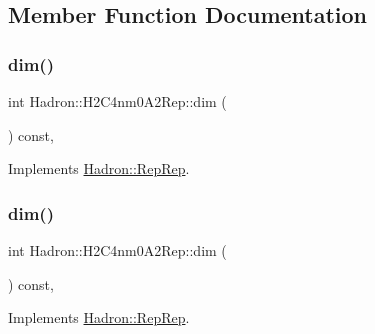 \subsection{Member Function Documentation}
\mbox{\label{structHadron_1_1H2C4nm0A2Rep_a4aa552a74cfc75c88b7a8a4137e501af}} 
\subsubsection{\texorpdfstring{dim()}{dim()}\hspace{0.1cm}{\footnotesize\ttfamily [1/5]}}
{\footnotesize\ttfamily int Hadron\+::\+H2\+C4nm0\+A2\+Rep\+::dim (\begin{DoxyParamCaption}{ }\end{DoxyParamCaption}) const\hspace{0.3cm}{\ttfamily [inline]}, {\ttfamily [virtual]}}



Implements \mbox{\hyperlink{structHadron_1_1RepRep_a92c8802e5ed7afd7da43ccfd5b7cd92b}{Hadron\+::\+Rep\+Rep}}.

\mbox{\label{structHadron_1_1H2C4nm0A2Rep_a4aa552a74cfc75c88b7a8a4137e501af}} 
\subsubsection{\texorpdfstring{dim()}{dim()}\hspace{0.1cm}{\footnotesize\ttfamily [2/5]}}
{\footnotesize\ttfamily int Hadron\+::\+H2\+C4nm0\+A2\+Rep\+::dim (\begin{DoxyParamCaption}{ }\end{DoxyParamCaption}) const\hspace{0.3cm}{\ttfamily [inline]}, {\ttfamily [virtual]}}



Implements \mbox{\hyperlink{structHadron_1_1RepRep_a92c8802e5ed7afd7da43ccfd5b7cd92b}{Hadron\+::\+Rep\+Rep}}.

\mbox{\label{structHadron_1_1H2C4nm0A2Rep_a4aa552a74cfc75c88b7a8a4137e501af}} 
